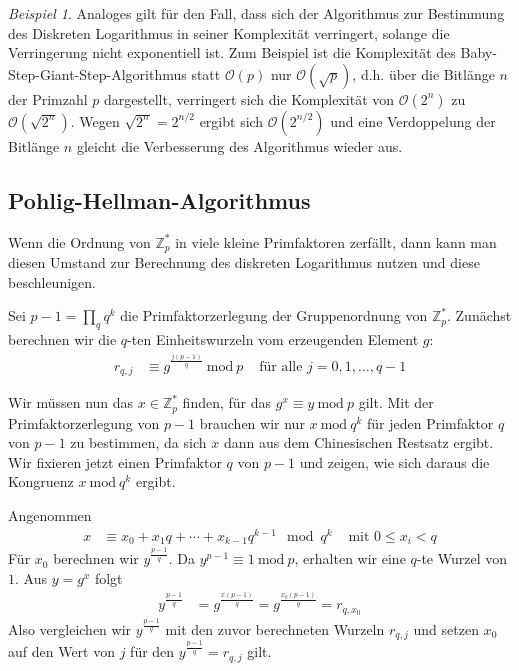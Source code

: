 \documentclass[
  a4paper,
  11pt,
]{scrartcl}
\theoremstyle{plain}
\theoremstyle{definition}
\theoremstyle{remark}
\newtheorem{beispiel}{Beispiel}
\newcommand{\Z}{\mathbb{Z}}
\newcommand{\Mod}[1]{\ \mathrm{mod}\ #1}
\begin{document}
\begin{beispiel}
  Analoges gilt für den Fall, dass sich der Algorithmus zur Bestimmung des Diskreten Logarithmus in seiner Komplexität verringert, solange die Verringerung nicht exponentiell ist. Zum Beispiel ist die Komplexität des Baby-Step-Giant-Step-Algorithmus statt $\mathcal{O}(p)$ nur $\mathcal{O}(\sqrt{p})$, d.h. über die Bitlänge $n$ der Primzahl $p$ dargestellt, verringert sich die Komplexität von $\mathcal{O}(2^n)$ zu $\mathcal{O}(\sqrt{2^n})$. Wegen $\sqrt{2^n} = 2^{n/2}$ ergibt sich $\mathcal{O}(2^{n/2})$ und eine Verdoppelung der Bitlänge $n$ gleicht die Verbesserung des Algorithmus wieder aus.
\end{beispiel}

\subsection{Pohlig-Hellman-Algorithmus}
\label{sub:pohlig_hellman_algorithmus}

Wenn die Ordnung von $\Z_p^*$ in viele kleine Primfaktoren zerfällt, dann kann
man diesen Umstand zur Berechnung des diskreten Logarithmus nutzen und diese
beschleunigen.

Sei $p-1 = \prod\limits_q q^k$ die Primfaktorzerlegung der Gruppenordnung von
$\Z_p^*$. Zunächst berechnen wir die $q$-ten Einheitswurzeln vom erzeugenden
Element $g$:
\begin{align*}
  r_{q, j} &
    \equiv g^{\frac{j(p-1)}{q}} \Mod{p} &
    \text{ für alle } j = 0, 1, \ldots, q-1
\end{align*}

Wir müssen nun das $x \in \Z_p^*$ finden, für das $g^x \equiv y \Mod{p}$ gilt.
Mit der Primfaktorzerlegung von $p-1$ brauchen wir nur $x \Mod{q^k}$ für jeden
Primfaktor $q$ von $p-1$ zu bestimmen, da sich $x$ dann aus dem Chinesischen
Restsatz ergibt. Wir fixieren jetzt einen Primfaktor $q$ von $p-1$ und zeigen,
wie sich daraus die Kongruenz $x \Mod{q^k}$ ergibt.

Angenommen
\begin{align*}
  x & \equiv x_0 + x_1 q + \cdots + x_{k-1} q^{k-1} \mod q^k
    & \text{ mit } 0 \leq x_i < q
\end{align*}
Für $x_0$ berechnen wir $y^{\frac{p-1}{q}}$. Da $y^{p-1} \equiv 1 \Mod{p}$,
erhalten wir eine $q$-te Wurzel von $1$. Aus $y = g^x$ folgt
\begin{align*}
  y^{\frac{p-1}{q}} &
    = g^{\frac{x(p-1)}{q}}
    = g^{\frac{x_0 (p-1)}{q}}
    = r_{q, x_0}
\end{align*}
Also vergleichen wir $y^{\frac{p-1}{q}}$ mit den zuvor berechneten Wurzeln
$r_{q, j}$ und setzen $x_0$ auf den Wert von $j$ für den
$y^{\frac{p-1}{q}} = r_{q, j}$ gilt.
\end{document}

